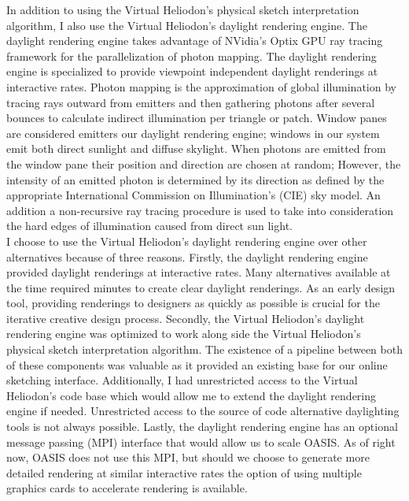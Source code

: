 	In addition to using the Virtual Heliodon's physical sketch interpretation algorithm, I also use the Virtual Heliodon's daylight rendering engine\cite{li2011photon,nasman2013physical}. 
	The daylight rendering engine takes advantage of NVidia's Optix GPU ray tracing framework for the parallelization of photon mapping\cite{parker2010optix}.
	The daylight rendering engine is specialized to provide viewpoint independent daylight renderings at interactive rates.
	Photon mapping is the approximation of global illumination by tracing rays outward from emitters and then gathering photons after several bounces to calculate indirect illumination per triangle or patch\cite{hachisuka2008progressive}.
	Window panes are considered emitters our daylight rendering engine; windows in our system emit both direct sunlight and diffuse skylight.
	When photons are emitted from the window pane their position and direction are chosen at random; However, the intensity of an emitted photon is determined by its direction as defined by the appropriate International Commission on Illumination's (CIE) sky model\cite{matsuura1988luminance}.
	An addition a non-recursive ray tracing procedure is used to take into consideration the hard edges of illumination caused from direct sun light. 
	\\

	I choose to use the Virtual Heliodon's daylight rendering engine over other alternatives because of three reasons.
	Firstly, the daylight rendering engine provided daylight renderings at interactive rates. Many alternatives available at the time required minutes to create clear daylight renderings. As an early design tool, providing renderings to designers as quickly as possible is crucial for the iterative creative design process.
	Secondly, the Virtual Heliodon's daylight rendering engine was optimized to work along side the Virtual Heliodon's physical sketch interpretation algorithm. The existence of a pipeline between both of these components was valuable as it provided an existing base for our online sketching interface. Additionally, I had unrestricted access to the Virtual Heliodon's code base which would allow me to extend the daylight rendering engine if needed. Unrestricted access to the source of code alternative daylighting tools is not always possible.
	Lastly, the daylight rendering engine has an optional message passing (MPI) interface that would allow us to scale OASIS. As of right now, OASIS does not use this MPI, but should we choose to generate more detailed rendering at similar interactive rates the option of using multiple graphics cards to accelerate rendering is available.
	\\

